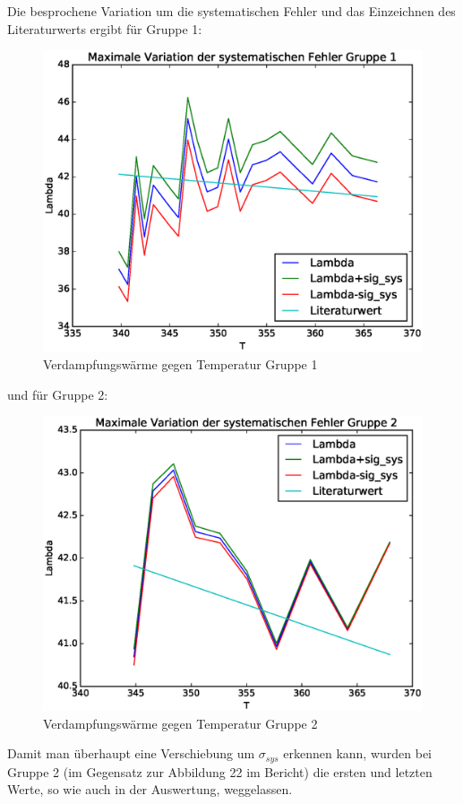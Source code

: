 \documentclass[10pt,a4paper]{article}
\begin{document}
Die besprochene Variation um die systematischen Fehler und das Einzeichnen des Literaturwerts ergibt für Gruppe 1:

\begin{figure}[H]
\centering
\includegraphics[scale=0.70]{Variation_sig_sys_G1.eps}
\caption{Verdampfungswärme gegen Temperatur Gruppe 1}
\end{figure}

und für Gruppe 2:
\begin{figure}[H]
\centering
\includegraphics[scale=0.70]{Variation_sig_sys_G2.eps}
\caption{Verdampfungswärme gegen Temperatur Gruppe 2}
\end{figure}
Damit man überhaupt eine Verschiebung um $\sigma_{sys}$ erkennen kann, wurden bei Gruppe 2 (im Gegensatz zur Abbildung 22 im Bericht) die ersten und letzten Werte, so wie auch in der Auswertung, weggelassen.
\end{document}
